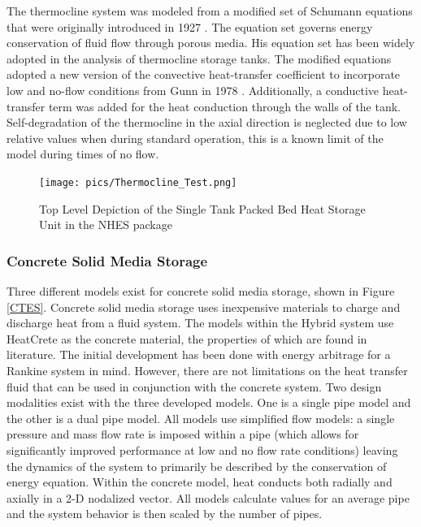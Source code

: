 The thermocline system was modeled from a modified set of Schumann equations that were originally introduced in 1927 \cite{Schumann}. The equation set governs energy conservation of fluid flow through porous media. His equation set has been widely adopted in the analysis of thermocline storage tanks. The modified equations adopted a new version of the convective heat-transfer coefficient to incorporate low and no-flow conditions from Gunn in 1978 \cite{specialHeattransfer}. Additionally, a conductive heat-transfer term was added for the heat conduction through the walls of the tank. Self-degradation of the thermocline in the axial direction is neglected due to low relative values when during standard operation, this is a known limit of the model during times of no flow.

\begin{figure}[hbtp]
\centering
\texttt{[image: pics/Thermocline\_Test.png]}
\caption{Top Level Depiction of the Single Tank Packed Bed Heat Storage Unit in the NHES package}
\label{Top View Thermocline}
\end{figure}

\subsubsection{Concrete Solid Media Storage}

Three different models exist for concrete solid media storage, shown in Figure \ref{CTES}. Concrete solid media storage uses inexpensive materials to charge and discharge heat from a fluid system. The models within the Hybrid system use HeatCrete as the concrete material, the properties of which are found in literature. The initial development has been done with energy arbitrage for a Rankine system in mind. However, there are not limitations on the heat transfer fluid that can be used in conjunction with the concrete system. Two design modalities exist with the three developed models. One is a single pipe model and the other is a dual pipe model. All models use simplified flow models: a single pressure and mass flow rate is imposed within a pipe (which allows for significantly improved performance at low and no flow rate conditions) leaving the dynamics of the system to primarily be described by the conservation of energy equation. Within the concrete model, heat conducts both radially and axially in a 2-D nodalized vector. All models calculate values for an average pipe and the system behavior is then scaled by the number of pipes. 

